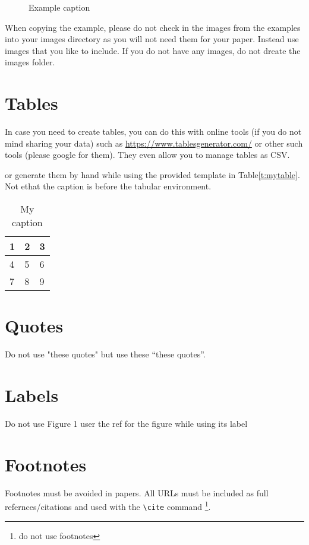 \begin{figure}[!ht]
  \caption{Example caption}\label{f:fly}
\end{figure}

When copying the example, please do not check in the images from the
examples into your images directory as you will not need them for your
paper. Instead use images that you like to include. If you do not have
any images, do not dreate the images folder.

\section{Tables}

In case you need to create tables, you can do this with online tools
(if you do not mind sharing your data) such as
\url{https://www.tablesgenerator.com/} or other such tools (please
google for them). They even allow you to manage tables as CSV.

or generate them by hand while using the provided template in Table\ref{t:mytable}. Not ethat
the caption is before the tabular environment.

\begin{table}[htb]
\centering
\caption{My caption}
\label{t:mytabble}
\begin{tabular}{lll}
1 & 2 & 3 \\
\hline
4 & 5 & 6 \\
7 & 8 & 9
\end{tabular}
\end{table}

\section{Quotes}

Do not use "these quotes" but use these ``these quotes''.

\section{Labels}

Do not use Figure 1 user the ref for the figure while using its label

\section{Footnotes}

Footnotes must be avoided in papers. All URLs must be included as full
refernces/citations and used with the \verb|\cite| command
\footnote{do not use footnotes}.


